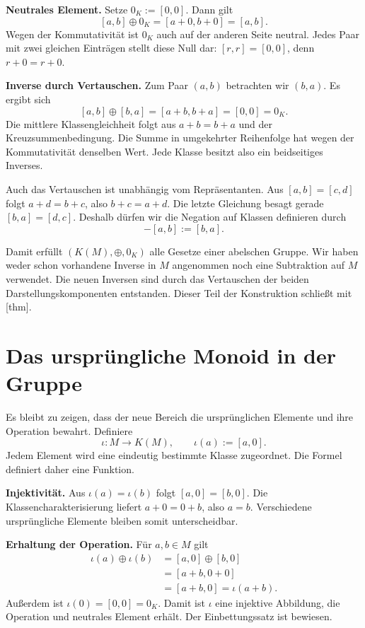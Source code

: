 \medskip\noindent\textbf{Neutrales Element.}
Setze \(0_K:=[0,0]\). Dann gilt
\[
  [a,b]\oplus0_K=[a+0,b+0]=[a,b].
\]
Wegen der Kommutativität ist \(0_K\) auch auf der anderen
Seite neutral. Jedes Paar mit zwei gleichen Einträgen stellt
diese Null dar: \([r,r]=[0,0]\), denn \(r+0=r+0\).

\medskip\noindent\textbf{Inverse durch Vertauschen.}
Zum Paar \((a,b)\) betrachten wir \((b,a)\). Es ergibt sich
\[
  [a,b]\oplus[b,a]=[a+b,b+a]=[0,0]=0_K.
\]
Die mittlere Klassengleichheit folgt aus \(a+b=b+a\) und
der Kreuzsummenbedingung. Die Summe in umgekehrter Reihenfolge
hat wegen der Kommutativität denselben Wert. Jede Klasse besitzt
also ein beidseitiges Inverses.

Auch das Vertauschen ist unabhängig vom Repräsentanten. Aus
\([a,b]=[c,d]\) folgt \(a+d=b+c\), also \(b+c=a+d\).
Die letzte Gleichung besagt gerade \([b,a]=[d,c]\). Deshalb
dürfen wir die Negation auf Klassen definieren durch
\[
  -[a,b]:=[b,a].
\]

Damit erfüllt \((K(M),\oplus,0_K)\) alle Gesetze einer
abelschen Gruppe. Wir haben weder schon vorhandene Inverse in
\(M\) angenommen noch eine Subtraktion auf \(M\) verwendet.
Die neuen Inversen sind durch das Vertauschen der beiden
Darstellungskomponenten entstanden. Dieser Teil der Konstruktion
schließt mit [thm].

\par{}
\hypertarget{differences.reading.embedding}{}
\section*{Das ursprüngliche Monoid in der Gruppe}

Es bleibt zu zeigen, dass der neue Bereich die ursprünglichen
Elemente und ihre Operation bewahrt. Definiere
\[
  \iota\colon M\longrightarrow K(M),
  \qquad \iota(a):=[a,0].
\]
Jedem Element wird eine eindeutig bestimmte Klasse zugeordnet.
Die Formel definiert daher eine Funktion.

\medskip\noindent\textbf{Injektivität.}
Aus \(\iota(a)=\iota(b)\) folgt \([a,0]=[b,0]\).
Die Klassencharakterisierung liefert \(a+0=0+b\), also
\(a=b\). Verschiedene ursprüngliche Elemente bleiben somit
unterscheidbar.

\medskip\noindent\textbf{Erhaltung der Operation.}
Für \(a,b\in M\) gilt
\[
  \begin{aligned}
    \iota(a)\oplus\iota(b)
      &=[a,0]\oplus[b,0]\\
      &=[a+b,0+0]\\
      &=[a+b,0]=\iota(a+b).
  \end{aligned}
\]
Außerdem ist \(\iota(0)=[0,0]=0_K\). Damit ist \(\iota\)
eine injektive Abbildung, die Operation und neutrales Element
erhält. Der Einbettungssatz ist bewiesen.

